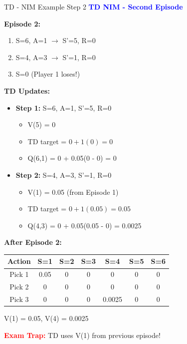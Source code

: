 \documentclass[8pt]{beamer}
\begin{document}
\begin{frame}{TD - NIM Example Step 2}
\fontsize{6.5}{7.5}\selectfont
\textcolor{blue}{\textbf{TD NIM - Second Episode}}

\textbf{Episode 2:}
\begin{enumerate}
\item S=6, A=1 $\rightarrow$ S'=5, R=0
\item S=4, A=3 $\rightarrow$ S'=1, R=0
\item S=0 (Player 1 loses!)
\end{enumerate}

\textbf{TD Updates:}
\begin{itemize}
\item \textbf{Step 1:} S=6, A=1, S'=5, R=0
\begin{itemize}
\item V(5) = 0
\item TD target = $0 + 1(0) = 0$
\item Q(6,1) = 0 + 0.05(0 - 0) = 0
\end{itemize}
\item \textbf{Step 2:} S=4, A=3, S'=1, R=0
\begin{itemize}
\item V(1) = 0.05 (from Episode 1)
\item TD target = $0 + 1(0.05) = 0.05$
\item Q(4,3) = 0 + 0.05(0.05 - 0) = 0.0025
\end{itemize}
\end{itemize}

\textbf{After Episode 2:}
\begin{tabular}{|c|c|c|c|c|c|c|}
\hline
Action & S=1 & S=2 & S=3 & S=4 & S=5 & S=6 \\
\hline
Pick 1 & 0.05 & 0 & 0 & 0 & 0 & 0 \\
\hline
Pick 2 & 0 & 0 & 0 & 0 & 0 & 0 \\
\hline
Pick 3 & 0 & 0 & 0 & 0.0025 & 0 & 0 \\
\hline
\end{tabular}
V(1) = 0.05, V(4) = 0.0025

\textcolor{red}{\textbf{Exam Trap:}} TD uses V(1) from previous episode!
\end{frame}
\end{document}
